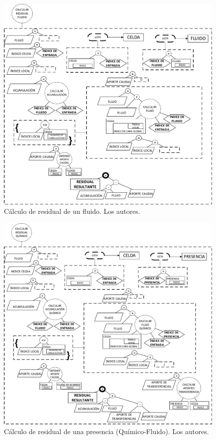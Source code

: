 \begin{figure}[h]
	\centering%
	\includegraphics[width=0.9\linewidth]{Fig/CalcularResidualFluido.pdf}%
	\caption[Cálculo de residual de un fluido.]{Cálculo de residual de un fluido. Los autores.} \label{fig:ResidualFluid}
\end{figure}

\begin{figure}[h]
	\centering%
	\includegraphics[width=0.9\linewidth]{Fig/CalcularResidualQuimico.pdf}%
	\caption[Cálculo de residual de una presencia.]{Cálculo de residual de una presencia (Químico-Fluido). Los autores.} \label{fig:ResidualChemical}
\end{figure}

